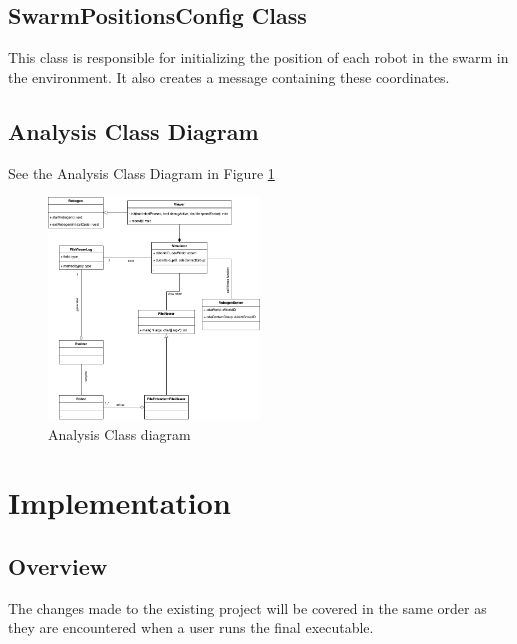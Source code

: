 \documentclass[11pt,a4paper]{article}
\begin{document}
\subsection{SwarmPositionsConfig Class}

This class is responsible for initializing the position of each robot in the swarm in the environment.
It also creates a message containing these coordinates.

\subsection{Analysis Class Diagram}
See the Analysis Class Diagram in Figure \ref{fig:analysis-class-diagram}

\begin{figure}[htpb]
    \centering
    \includegraphics[width=0.5\textwidth]{1}
    \caption{Analysis Class diagram}
    \label{fig:analysis-class-diagram}
\end{figure}

\section{Implementation}


\subsection{Overview}
The changes made to the existing project will be covered in the same order as
they are encountered when a user runs the final executable.
\end{document}
